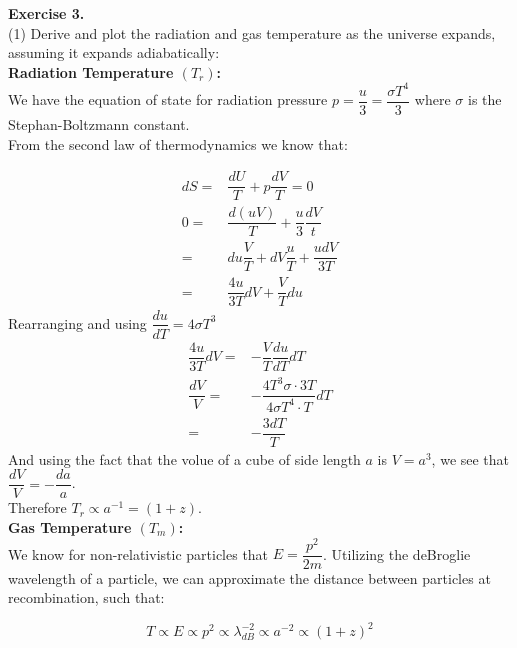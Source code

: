 \documentclass[a4paper]{article}
\begin{document}
\noindent \textbf{Exercise 3.}\\
(1) Derive and plot the radiation and gas temperature as the universe expands, assuming it expands adiabatically:\\
\textbf{Radiation Temperature $(T_r)$:}\\
We have the equation of state for radiation pressure $p = \dfrac{u}{3} = \dfrac{\sigma T^4}{3}
$ where $\sigma$ is the Stephan-Boltzmann constant.\\
From the second law of thermodynamics we know that:

\begin{align*}
dS =& \dfrac{dU}{T} + p\dfrac{dV}{T} = 0\\
0 =& \dfrac{d(uV)}{T} + \dfrac{u}{3} \dfrac{dV}{t}\\
=& du \dfrac{V}{T} + dV \dfrac{u}{T} + \dfrac{udV}{3T}\\
=& \dfrac{4u}{3T} dV + \dfrac{V}{T} du
\end{align*}
Rearranging and using $\dfrac{du}{dT} = 4\sigma T^3$
\begin{align*}
\dfrac{4u}{3T}dV =& - \dfrac{V}{T} \dfrac{du}{dT}dT\\
\dfrac{dV}{V} =& - \dfrac{4T^3 \sigma \cdot 3T}{4 \sigma T^4 \cdot T} dT\\
=& - \dfrac{3dT}{T}
\end{align*}
And using the fact that the volue of a cube of side length $a$ is $V = a^3$, we see that $\dfrac{dV}{V} = - \dfrac{da}{a}$.\\
Therefore $T_{r} \propto a^{-1} = (1+z).$\\
\textbf{Gas Temperature $(T_m)$:}\\
We know for non-relativistic particles that $E = \dfrac{p^2}{2m}$. Utilizing the deBroglie wavelength of a particle, we can approximate the distance between particles at recombination, such that:

\begin{equation}
T \propto E \propto p^2 \propto \lambda_{dB}^{-2} \propto a^{-2} \propto (1+z)^2
\end{equation}
\end{document}
